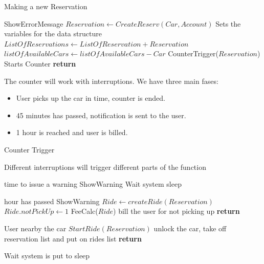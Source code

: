 \documentclass[a4paper]{article}
\begin{document}
\begin{algorithm}
\caption{Making a new Reservation}\label{MakeReserv}
\begin{algorithmic}[1]

	\State ShowErrorMessage
\Else
\State $Reservation \leftarrow CreateReserv(Car, Account)$ \Comment Sets the variables for the data structure
\State $ListOfReservations \leftarrow ListOfReservation + Reservation$
\State $listOfAvailableCars \leftarrow listOfAvailableCars - Car$
\State CounterTrigger($Reservation$) \Comment Starts Counter
\EndIf
\State \textbf{return} 
\EndProcedure
\end{algorithmic}
\end{algorithm}

The counter will work with interruptions. We have three main fases:
\begin{itemize} 
\item User picks up the car in time, counter is ended. 
\item 45 minutes has passed, notification is sent to the user.
\item 1 hour is reached and user is billed.
\end{itemize}

\begin{algorithm}[H]
\caption{Counter Trigger}\label{Counter}
\begin{algorithmic}[1]

\Comment Different interruptions will trigger different parts of the function

 \Comment time to issue a warning
	\State ShowWarning
	\State Wait \Comment system sleep
\EndIf


  hour has passed
	\State ShowWarning
	\State $Ride \leftarrow createRide(Reservation)$
	\State $Ride.notPickUp \leftarrow 1$ 
	\State FeeCalc($Ride$) \Comment bill the user for not picking up
	\State \textbf{return}
\EndIf

 \Comment User nearby the car
	\State $StartRide(Reservation)$ \Comment unlock the car, take off reservation list and put on rides list
	\State \textbf{return}
\EndIf
 
\State Wait \Comment system is put to sleep
\EndProcedure
\end{algorithmic}
\end{algorithm}
\end{document}
